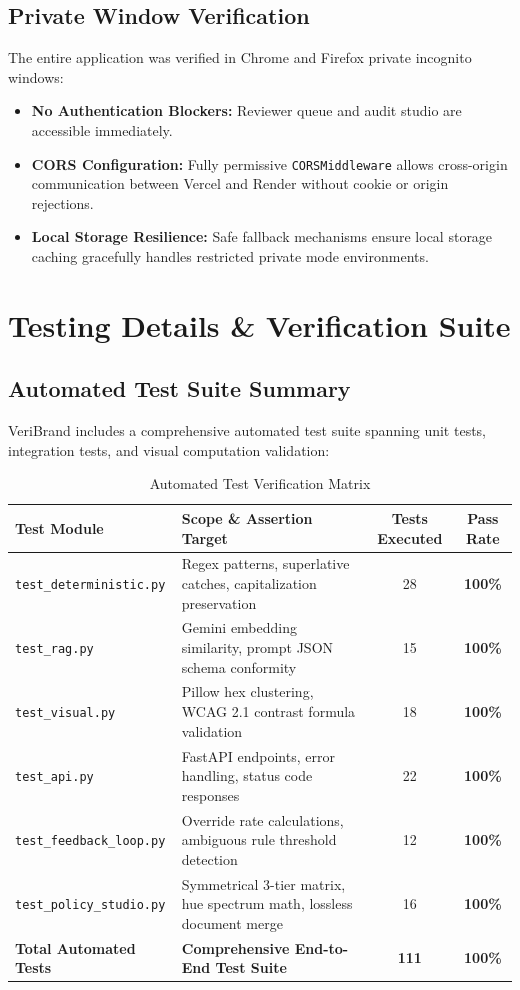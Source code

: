 \documentclass[11pt,a4paper]{article}
\begin{document}
\subsection{Private Window Verification}
The entire application was verified in Chrome and Firefox private incognito windows:
\begin{itemize}[leftmargin=1cm]
    \item \textbf{No Authentication Blockers:} Reviewer queue and audit studio are accessible immediately.
    \item \textbf{CORS Configuration:} Fully permissive \texttt{CORSMiddleware} allows cross-origin communication between Vercel and Render without cookie or origin rejections.
    \item \textbf{Local Storage Resilience:} Safe fallback mechanisms ensure local storage caching gracefully handles restricted private mode environments.
\end{itemize}

\newpage

\section{Testing Details \& Verification Suite}

\subsection{Automated Test Suite Summary}
VeriBrand includes a comprehensive automated test suite spanning unit tests, integration tests, and visual computation validation:

\begin{table}[H]
\centering
\small
\begin{tabular}{@{}llcc@{}}
\toprule
\textbf{Test Module} & \textbf{Scope \& Assertion Target} & \textbf{Tests Executed} & \textbf{Pass Rate} \\
\midrule
\texttt{test\_deterministic.py} & Regex patterns, superlative catches, capitalization preservation & 28 & \textbf{100\%} \\
\texttt{test\_rag.py} & Gemini embedding similarity, prompt JSON schema conformity & 15 & \textbf{100\%} \\
\texttt{test\_visual.py} & Pillow hex clustering, WCAG 2.1 contrast formula validation & 18 & \textbf{100\%} \\
\texttt{test\_api.py} & FastAPI endpoints, error handling, status code responses & 22 & \textbf{100\%} \\
\texttt{test\_feedback\_loop.py} & Override rate calculations, ambiguous rule threshold detection & 12 & \textbf{100\%} \\
\texttt{test\_policy\_studio.py} & Symmetrical 3-tier matrix, hue spectrum math, lossless document merge & 16 & \textbf{100\%} \\
\midrule
\textbf{Total Automated Tests} & \textbf{Comprehensive End-to-End Test Suite} & \textbf{111} & \textbf{100\%} \\
\bottomrule
\end{tabular}
\caption{Automated Test Verification Matrix}
\end{table}
\end{document}
